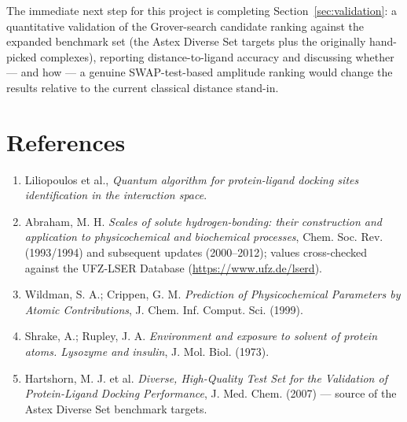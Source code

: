 \documentclass[11pt,a4paper]{article}
\begin{document}
The immediate next step for this project is completing Section~\ref{sec:validation}: a quantitative validation of the Grover-search candidate ranking against the expanded benchmark set (the Astex Diverse Set targets plus the originally hand-picked complexes), reporting distance-to-ligand accuracy and discussing whether — and how — a genuine SWAP-test-based amplitude ranking would change the results relative to the current classical distance stand-in.

\section*{References}

\begin{enumerate}
    \item Liliopoulos et al., \emph{Quantum algorithm for protein-ligand docking sites identification in the interaction space}.
    \item Abraham, M. H. \emph{Scales of solute hydrogen-bonding: their construction and application to physicochemical and biochemical processes}, Chem. Soc. Rev. (1993/1994) and subsequent updates (2000--2012); values cross-checked against the UFZ-LSER Database (\url{https://www.ufz.de/lserd}).
    \item Wildman, S. A.; Crippen, G. M. \emph{Prediction of Physicochemical Parameters by Atomic Contributions}, J. Chem. Inf. Comput. Sci. (1999).
    \item Shrake, A.; Rupley, J. A. \emph{Environment and exposure to solvent of protein atoms. Lysozyme and insulin}, J. Mol. Biol. (1973).
    \item Hartshorn, M. J. et al. \emph{Diverse, High-Quality Test Set for the Validation of Protein-Ligand Docking Performance}, J. Med. Chem. (2007) — source of the Astex Diverse Set benchmark targets.
\end{enumerate}
\end{document}

